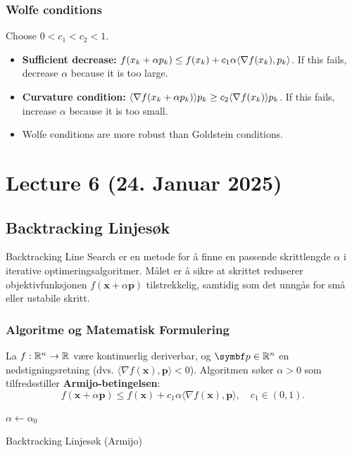 \subsubsection*{Wolfe conditions}
Choose  \(0 < c_1 < c_2 < 1\).
\begin{itemize}
  \item \textbf{Sufficient decrease:}  \(f(x_k + \alpha p_k) \leq f(x_k) + c_1 \alpha \langle\nabla f(x_k), p_k\rangle\). If this fails, decrease  \(\alpha\) because it is too large.
  \item \textbf{Curvature condition:}  \(\langle\nabla f(x_k + \alpha p_k)\rangle{p_k} \geq c_2 \langle\nabla f(x_k)\rangle{p_k}\). If this fails, increase  \(\alpha\) because it is too small.
  \item Wolfe conditions are more robust than Goldstein conditions.
\end{itemize}

\section{Lecture 6 (24. Januar 2025)}
\subsection*{Backtracking Linjesøk}
Backtracking Line Search er en metode for å finne en passende skrittlengde \( \alpha \) i iterative optimeringsalgoritmer. Målet er å sikre at skrittet reduserer objektivfunksjonen \( f(\bm{x} + \alpha \bm{p}) \) tilstrekkelig, samtidig som det unngås for små eller ustabile skritt.

\subsubsection*{Algoritme og Matematisk Formulering}
La \( f: \mathbb{R}^n \to \mathbb{R} \) være kontinuerlig deriverbar, og \( \bm{p} \in \R^n \) en nedstigningsretning (dvs. \( \langle \nabla f(\bm{x}), \bm{p} \rangle < 0 \)). Algoritmen søker \( \alpha > 0 \) som tilfredsstiller \textbf{Armijo-betingelsen}:
\[
  f(\bm{x} + \alpha \bm{p}) \leq f(\bm{x}) + c_1 \alpha \langle \nabla f(\bm{x}), \bm{p} \rangle, \quad c_1 \in (0, 1).
\]

\begin{algorithm}[H]
  \SetAlgoLined
  \DontPrintSemicolon
  \KwOut{ \(\alpha\)}
  \(\alpha \leftarrow \alpha_0\)\;
  \Return{ \(\alpha\)}
  \caption{Backtracking Linjesøk (Armijo)}
\end{algorithm}

